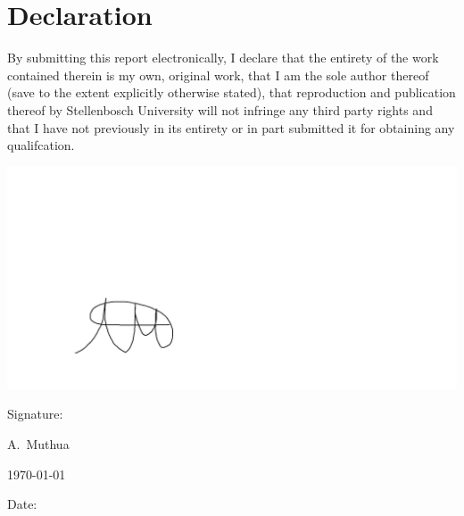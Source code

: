    \chapter{Declaration}

By submitting this report electronically, I declare that the entirety of the work contained
therein is my own, original work, that I am the sole author thereof (save to the extent
explicitly otherwise stated), that reproduction and publication thereof by Stellenbosch
University will not infringe any third party rights and that I have not previously in its
entirety or in part submitted it for obtaining any qualifcation.

\vspace{3cm}
\hspace{2cm}
\includegraphics[width=0.4\linewidth]{./Figures/Signature-Alex.png}\\
\noindent%
\parbox{.5\textwidth}{%
  Signature:\quad\dotfill\par
  \hfill A.\ Muthua\hspace{1.2cm}\null}


\vspace{1.2cm}
\hspace{2cm}
\today \\
\noindent%
\parbox{.5\textwidth}{%
  Date:\quad\dotfill\par}

